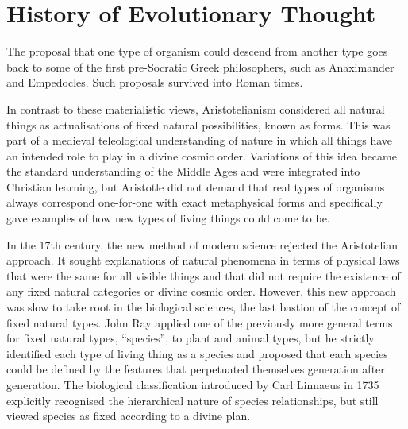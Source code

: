 \hypertarget{history-of-evolutionary-thought}{%
\section{History of Evolutionary Thought}\label{history-of-evolutionary-thought}}

The proposal that one type of organism could descend from another type goes back to some of the first pre-Socratic Greek philosophers, such as Anaximander and Empedocles. Such proposals survived into Roman times.

In contrast to these materialistic views, Aristotelianism considered all natural things as actualisations of fixed natural possibilities, known as forms. This was part of a medieval teleological understanding of nature in which all things have an intended role to play in a divine cosmic order. Variations of this idea became the standard understanding of the Middle Ages and were integrated into Christian learning, but Aristotle did not demand that real types of organisms always correspond one-for-one with exact metaphysical forms and specifically gave examples of how new types of living things could come to be.

In the 17th century, the new method of modern science rejected the Aristotelian approach. It sought explanations of natural phenomena in terms of physical laws that were the same for all visible things and that did not require the existence of any fixed natural categories or divine cosmic order. However, this new approach was slow to take root in the biological sciences, the last bastion of the concept of fixed natural types. John Ray applied one of the previously more general terms for fixed natural types, ``species'', to plant and animal types, but he strictly identified each type of living thing as a species and proposed that each species could be defined by the features that perpetuated themselves generation after generation. The biological classification introduced by Carl Linnaeus in 1735 explicitly recognised the hierarchical nature of species relationships, but still viewed species as fixed according to a divine plan.

